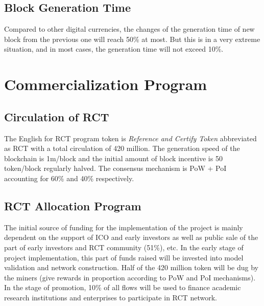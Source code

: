 \documentclass[a4paper,oneside,openany]{tufte-book}
\begin{document}
\section{Block Generation Time}
Compared to other digital currencies, the changes of the generation time of new block from the previous one will reach 50\% at most. But this is in a very extreme situation, and in most cases, the generation time will not exceed 10\%.





































\chapter{Commercialization Program}




\section{Circulation of RCT}


The English for RCT program token is \emph{Reference and Certify Token} abbreviated as RCT with a total circulation of 420 million. The generation speed of the blockchain is 1m/block and the initial amount of block incentive is 50 token/block regularly halved. The consensus mechanism is PoW + PoI accounting for 60\% and 40\% respectively.

\section{RCT Allocation Program}

The initial source of funding for the implementation of the project is mainly dependent on the support of ICO and early investors as well as public sale of the part of early investors and RCT community (51\%), etc. In the early stage of project implementation, this part of funds raised will be invested into model validation and network construction. Half of the 420 million token will be dug by the miners (give rewards in proportion according to PoW and PoI mechanisms). In the stage of promotion, 10\% of all flows will be used to finance academic research institutions and enterprises to participate in RCT network.
\end{document}
